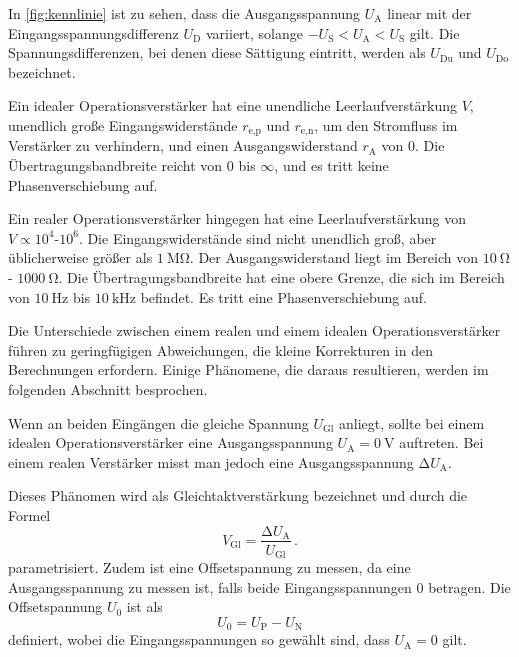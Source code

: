 In \autoref{fig:kennlinie} ist zu sehen, dass die Ausgangsspannung $U_\text{A}$ linear mit der Eingangsspannungsdifferenz $U_\text{D}$ variiert, solange $- U_\text{S} < U_\text{A} < U_\text{S}$ gilt. Die Spannungsdifferenzen, bei denen diese Sättigung eintritt, werden als $U_\text{Du}$ und $U_\text{Do}$ bezeichnet.

Ein idealer Operationsverstärker hat eine unendliche Leerlaufverstärkung $V$, unendlich große Eingangswiderstände $r_\text{e,p}$ und $r_\text{e,n}$, um den Stromfluss im Verstärker zu verhindern, und einen Ausgangswiderstand $r_\text{A}$ von $0$. Die Übertragungsbandbreite reicht von $0$ bis $\infty$, und es tritt keine Phasenverschiebung auf.

Ein realer Operationsverstärker hingegen hat eine Leerlaufverstärkung von $V \propto 10^4$-$10^6$. Die Eingangswiderstände sind nicht unendlich groß, aber üblicherweise größer als $\SI{1}{\mega\ohm}$. Der Ausgangswiderstand liegt im Bereich von $\SI{10}{\ohm}$ - $\SI{1000}{\ohm}$. Die Übertragungsbandbreite hat eine obere Grenze, die sich im Bereich von $\SI{10}{\hertz}$ bis $\SI{10}{\kilo\hertz}$ befindet. Es tritt eine Phasenverschiebung auf.

Die Unterschiede zwischen einem realen und einem idealen Operationsverstärker führen zu geringfügigen Abweichungen, die kleine Korrekturen in den Berechnungen erfordern. Einige Phänomene, die daraus resultieren, werden im folgenden Abschnitt besprochen.

\noindent 
Wenn an beiden Eingängen die gleiche Spannung $U_\text{Gl}$ anliegt, sollte bei einem idealen Operationsverstärker eine Ausgangsspannung $U_\text{A} = \SI{0}{\volt}$ auftreten. Bei einem realen Verstärker misst man jedoch eine Ausgangsspannung $\increment U_\text{A}$.

Dieses Phänomen wird als Gleichtaktverstärkung bezeichnet und durch die Formel
\begin{equation*}
    V_\text{Gl} = \frac{\increment U_\text{A}}{U_\text{Gl}}\, .
\end{equation*}
parametrisiert. Zudem ist eine Offsetspannung zu messen, da eine Ausgangsspannung zu messen ist, falls beide Eingangsspannungen $0$ betragen. Die Offsetspannung $U_0$ ist als 
\begin{equation*}
    U_0 = U_\text{P} - U_\text{N}
\end{equation*}
definiert, wobei die Eingangsspannungen so gewählt sind, dass $U_\text{A}=0$ gilt.

